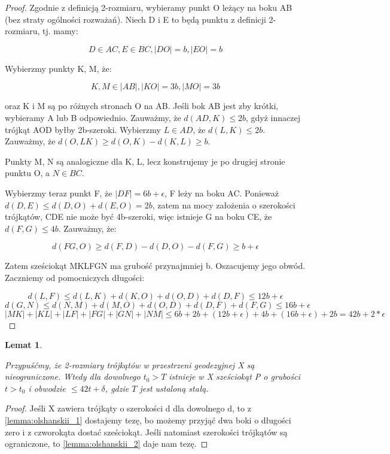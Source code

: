 \documentclass[licencjacka]{pracamgr}
\newtheorem{lemma}{Lemat}[section]
\begin{document}
\begin{proof}



Zgodnie z definicją 2-rozmiaru, wybieramy punkt O leżący na boku AB (bez straty ogólności rozważań). Niech D i E to będą punktu z definicji 2-rozmiaru, tj. mamy: 

\[ D \in AC, E \in BC, |DO| = b, |EO| = b \]

Wybierzmy punkty K, M, że:

\[ K, M \in |AB|, |KO| = 3b, |MO| = 3b  \]

\noindent
oraz K i M są po różnych stronach O na AB. Jeśli bok AB jest zby krótki, wybieramy A lub B odpowiednio. Zauważmy, że $d(AD, K) \leq 2b$, gdyż innaczej trójkąt AOD byłby 2b-szeroki. Wybierzmy $L \in AD$, że $d(L, K) \leq 2b$. Zauważmy, że $d(O, LK) \geq d(O, K) - d(K, L) \geq b$.

Punkty M, N są analogiczne dla K, L, lecz konstrujemy je po drugiej stronie punktu O, a $N \in BC$.

Wybierzmy teraz punkt F, że $|DF| = 6b + \epsilon$, F leży na boku AC. Ponieważ $d(D, E) \leq d(D, O) + d(E, O) = 2b$, zatem na mocy założenia o szerokości trójkątów, CDE nie może być 4b-szeroki, więc istnieje G na boku CE, że $d(F, G) \leq 4b$. Zauważmy, że:

\[ d(FG, O) \geq d(F, D) - d(D, O) - d(F, G) \geq b + \epsilon \]

Zatem sześciokąt MKLFGN ma grubość przynajmniej b. Oszacujemy jego obwód. Zaczniemy od pomocniczych długości:

\[ d(L, F) \leq d(L, K) + d(K, O) + d(O, D) + d(D, F) \leq 12b + \epsilon \]
\[ d(G, N) \leq d(N, M) + d(M, O) + d(O, D) + d(D, F) + d(F, G) \leq 16b + \epsilon \]
\[ |MK| + |KL| + |LF| + |FG| + |GN| + |NM|  \leq 6b + 2b + (12b + \epsilon) + 4b + (16b + \epsilon) + 2b = 42b + 2 * \epsilon \]

\end{proof}

\begin{lemma}\label{lemma:olshanskii_3}

Przypuśćmy, że 2-rozmiary trójkątów w przestrzeni geodezyjnej X są nieograniczone. Wtedy dla dowolnego $t_{0} > T$ istnieje w X sześciokąt P o grubości $t > t_{0}$ i obwodzie $\leq 42t + \delta$, gdzie $T$ jest ustaloną stałą.

\end{lemma}

\begin{proof}

Jeśli X zawiera trójkąty o szerokości d dla dowolnego d, to z \ref{lemma:olshanskii_1} dostajemy tezę, bo możemy przyjąć dwa boki o długości zero i z czworokąta dostać sześciokąt. Jeśli natomiast szerokości trójkątów są ograniczone, to \ref{lemma:olshanskii_2} daje nam tezę.

\end{proof}
\end{document}
